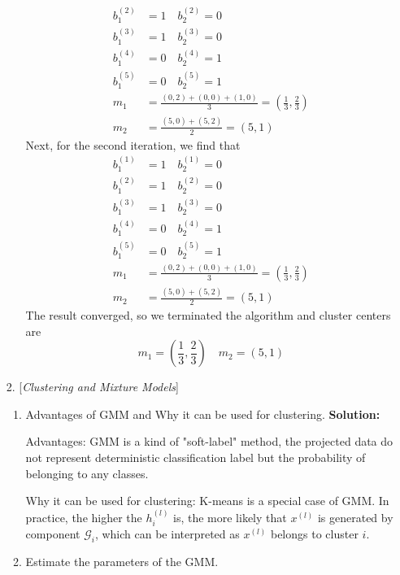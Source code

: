\documentclass{article}
\begin{document}
\begin{enumerate}
\begin{enumerate}
\begin{align*}
                b_1^{(2)}&=1\quad b_2^{(2)}=0\\
                b_1^{(3)}&=1\quad b_2^{(3)}=0\\
                b_1^{(4)}&=0\quad b_2^{(4)}=1\\
                b_1^{(5)}&=0\quad b_2^{(5)}=1\\
                m_1&=\frac{(0,2)+(0,0)+(1,0)}{3}=(\frac{1}{3},\frac{2}{3})\\
                m_2 &= \frac{(5,0)+(5,2)}{2}=(5,1)
              \end{align*}
              Next, for the second iteration, we find that 
              \begin{align*}
                b_1^{(1)}&=1\quad b_2^{(1)}=0\\
                b_1^{(2)}&=1\quad b_2^{(2)}=0\\
                b_1^{(3)}&=1\quad b_2^{(3)}=0\\
                b_1^{(4)}&=0\quad b_2^{(4)}=1\\
                b_1^{(5)}&=0\quad b_2^{(5)}=1\\
                m_1&=\frac{(0,2)+(0,0)+(1,0)}{3}=(\frac{1}{3},\frac{2}{3})\\
                m_2 &= \frac{(5,0)+(5,2)}{2}=(5,1)
              \end{align*}
              The result converged, so we terminated the algorithm and cluster centers are 
              \[m_1=(\frac{1}{3},\frac{2}{3})\quad m_2 = (5,1)\]
	      \end{enumerate}
	\item [2.] [\textit{Clustering and Mixture Models}]
	      \begin{enumerate}
		      \setlength\parindent{2em}
		      \item Advantages of GMM and Why it can be used for clustering.\newline
		      {\bf Solution:}
              \par Advantages: GMM is a kind of "soft-label" method, the projected data do not represent deterministic classification label but the probability of belonging to any classes.
              \par Why it can be used for clustering: K-means is a special case of GMM. In practice, the higher the $h_i^{(l)}$ is, the more likely that $x^{(l)}$ is generated by component $\mathcal{G}_i$, which can be interpreted as $x^{(l)}$ belongs to cluster $i$.
		      \item Estimate the parameters of the GMM.

\end{enumerate}
\end{enumerate}
\end{document}

